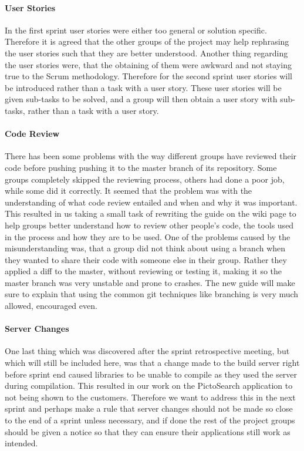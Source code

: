 \paragraph{User Stories} In the first sprint user stories were either too general or solution specific.
Therefore it is agreed that the other groups of the project may help rephrasing the user stories such that they are better understood.
Another thing regarding the user stories were, that the obtaining of them were awkward and not staying true to the Scrum methodology.
Therefore for the second sprint user stories will be introduced rather than a task with a user story.
These user stories will be given sub-tasks to be solved, and a group will then obtain a user story with sub-tasks, rather than a task with a user story.

\paragraph{Code Review}
There has been some problems with the way different groups have reviewed their code before pushing pushing it to the master branch of its repository.
Some groups completely skipped the reviewing process, others had done a poor job, while some did it correctly.
It seemed that the problem was with the understanding of what code review entailed and when and why it was important.
This resulted in us taking a small task of rewriting the guide on the wiki page to help groups better understand how to review other people's code, the tools used in the process and how they are to be used.
One of the problems caused by the misunderstanding was, that a group did not think about using a branch when they wanted to share their code with someone else in their group.
Rather they applied a diff to the master, without reviewing or testing it, making it so the master branch was very unstable and prone to crashes.
The new guide will make sure to explain that using the common git techniques like branching is very much allowed, encouraged even.


\paragraph{Server Changes}
One last thing which was discovered after the sprint retrospective meeting, but which will still be included here, was that a change made to the build server right before sprint end caused libraries to be unable to compile as they used the server during compilation.
This resulted in our work on the PictoSearch application to not being shown to the customers.
Therefore we want to address this in the next sprint and perhaps make a rule that server changes should not be made so close to the end of a sprint unless necessary, and if done the rest of the project groups should be given a notice so that they can ensure their applications still work as intended.


